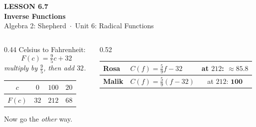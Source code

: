 \documentclass[aspectratio=169, 11pt]{beamer}
\begin{document}
{
\begin{frame}[plain]
  \vspace{2.8cm}\hspace{0.55cm}%
  \begin{minipage}{0.9\textwidth}
    {\color{goldacc}\bfseries\small LESSON 6.7}\\[0.5cm]
    {\color{white}\bfseries\LARGE Inverse Functions}\\[1.2cm]
    {\color{forestmid}\small Algebra 2: Shepherd~$\cdot$~Unit 6: Radical Functions}
  \end{minipage}
\end{frame}
}

\begin{frame}[t, plain]
  \begin{columns}[T]
    \begin{column}{0.44\textwidth}
      \footnotesize
      Celsius to Fahrenheit:
      \[ F(c)=\tfrac{9}{5}c+32 \]
      \emph{multiply by $\tfrac95$, then add $32$.}
      \vspace{4pt}
      \begin{center}
      \renewcommand{\arraystretch}{1.3}
      \begin{tabular}{|c|c|c|c|}
      \hline
      $c$ & $0$ & $100$ & $20$ \\ \hline
      $F(c)$ & $32$ & $212$ & $68$ \\ \hline
      \end{tabular}
      \end{center}
      \vspace{6pt}
      Now go the \emph{other} way.
    \end{column}
    \begin{column}{0.52\textwidth}
      \footnotesize
      \begin{center}
      \renewcommand{\arraystretch}{1.5}
      \begin{tabular}{|l|l|c|}
      \hline
      \textbf{Rosa} & $C(f)=\frac{5}{9}f-32$ & at $212$: $\approx85.8$ \\ \hline
      \textbf{Malik} & $C(f)=\frac{5}{9}(f-32)$ & at $212$: $\mathbf{100}$ \\ \hline
      \end{tabular}
      \end{center}
      \vspace{6pt}

\end{column}
\end{columns}
\end{frame}
\end{document}
